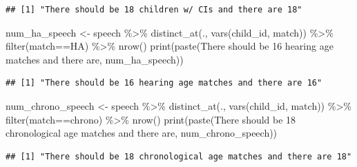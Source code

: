 \documentclass[
]{article}
\newenvironment{Shaded}{\begin{snugshade}}{\end{snugshade}}
\newcommand{\FunctionTok}[1]{\textcolor[rgb]{0.00,0.00,0.00}{#1}}
\newcommand{\NormalTok}[1]{#1}
\newcommand{\OtherTok}[1]{\textcolor[rgb]{0.56,0.35,0.01}{#1}}
\newcommand{\SpecialCharTok}[1]{\textcolor[rgb]{0.00,0.00,0.00}{#1}}
\newcommand{\StringTok}[1]{\textcolor[rgb]{0.31,0.60,0.02}{#1}}
\begin{document}
\begin{verbatim}
## [1] "There should be 18 children w/ CIs and there are 18"
\end{verbatim}

\begin{Shaded}
\begin{Highlighting}[]
\NormalTok{num\_ha\_speech }\OtherTok{\textless{}{-}}\NormalTok{ speech }\SpecialCharTok{\%\textgreater{}\%} 
  \FunctionTok{distinct\_at}\NormalTok{(., }\FunctionTok{vars}\NormalTok{(child\_id, match)) }\SpecialCharTok{\%\textgreater{}\%}
  \FunctionTok{filter}\NormalTok{(match}\SpecialCharTok{==}\StringTok{\textquotesingle{}HA\textquotesingle{}}\NormalTok{) }\SpecialCharTok{\%\textgreater{}\%}
  \FunctionTok{nrow}\NormalTok{()}
\FunctionTok{print}\NormalTok{(}\FunctionTok{paste}\NormalTok{(}\StringTok{\textquotesingle{}There should be 16 hearing age matches and there are\textquotesingle{}}\NormalTok{, num\_ha\_speech)) }
\end{Highlighting}
\end{Shaded}

\begin{verbatim}
## [1] "There should be 16 hearing age matches and there are 16"
\end{verbatim}

\begin{Shaded}
\begin{Highlighting}[]
\NormalTok{num\_chrono\_speech }\OtherTok{\textless{}{-}}\NormalTok{ speech }\SpecialCharTok{\%\textgreater{}\%} 
  \FunctionTok{distinct\_at}\NormalTok{(., }\FunctionTok{vars}\NormalTok{(child\_id, match)) }\SpecialCharTok{\%\textgreater{}\%} 
  \FunctionTok{filter}\NormalTok{(match}\SpecialCharTok{==}\StringTok{\textquotesingle{}chrono\textquotesingle{}}\NormalTok{) }\SpecialCharTok{\%\textgreater{}\%}
  \FunctionTok{nrow}\NormalTok{()}
\FunctionTok{print}\NormalTok{(}\FunctionTok{paste}\NormalTok{(}\StringTok{\textquotesingle{}There should be 18 chronological age matches and there are\textquotesingle{}}\NormalTok{, num\_chrono\_speech))}
\end{Highlighting}
\end{Shaded}

\begin{verbatim}
## [1] "There should be 18 chronological age matches and there are 18"
\end{verbatim}
\end{document}
